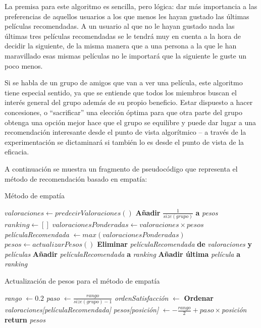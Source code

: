 La premisa para este algoritmo es sencilla, pero lógica: dar más importancia a las preferencias de aquellos usuarios a los que menos les hayan gustado las últimas películas recomendadas. A un usuario al que no le hayan gustado nada las últimas tres películas recomendadas se le tendrá muy en cuenta a la hora de decidir la siguiente, de la misma manera que a una persona a la que le han maravillado esas mismas películas no le importará que la siguiente le guste un poco menos.

Si se habla de un grupo de amigos que van a ver una película, este algoritmo tiene especial sentido, ya que se entiende que todos los miembros buscan el interés general del grupo además de su propio beneficio. Estar dispuesto a hacer concesiones, o ``sacrificar'' una elección óptima para que otra parte del grupo obtenga una opción mejor hace que el grupo se equilibre y puede dar lugar a una recomendación interesante desde el punto de vista algorítmico -- a través de la experimentación se dictaminará si también lo es desde el punto de vista de la eficacia.

A continuación se muestra un fragmento de pseudocódigo que representa el método de recomendación basado en empatía:
\newpage

\begin{algorithm}
	\caption{Método de empatía}
	\begin{algorithmic}[1]
		\State $valoraciones \gets predecirValoraciones()$
		\State \textbf{Añadir} $\frac{1}{size(grupo)}$ \textbf{a} \textit{pesos}
		\EndFor
		\State $ranking \gets []$
		\State $valoracionesPonderadas \gets valoraciones \times pesos$
		\State \textit{películaRecomendada} $ \gets max(valoracionesPonderadas)$
		\State $pesos \gets actualizarPesos()$
		\State \textbf{Eliminar} \textit{películaRecomendada} \textbf{de} \textit{valoraciones} \textbf{y} \textit{películas}
		\State \textbf{Añadir} \textit{películaRecomendada} \textbf{a} \textit{ranking}
		\EndWhile
		\State \textbf{Añadir última} \textit{película} \textbf{a} \textit{ranking}
	\end{algorithmic}
\end{algorithm}

\begin{algorithm}
	\caption{Actualización de pesos para el método de empatía}
	\begin{algorithmic}[1]
		\State \textit{rango} $\gets 0.2$
		\State \textit{paso} $\gets \frac{rango}{size(grupo) - 1}$
		\State \textit{ordenSatisfacción} $\gets$ \textbf{Ordenar} \textit{valoraciones[películaRecomendada]}
		\State \textit{pesos[posición]} $\gets -\frac{rango}{2} + paso \times $\textit{posición}
		\EndFor
		\State \textbf{return} \textit{pesos}
	\end{algorithmic}
\end{algorithm}

